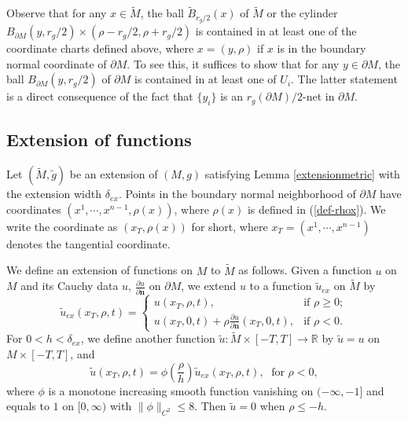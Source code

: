 \documentclass[11pt,letterpaper]{amsart}
\numberwithin{equation}{section}
\theoremstyle{definition}
\theoremstyle{plain}
\theoremstyle{definition}
\theoremstyle{plain}
\theoremstyle{definition}
\theoremstyle{plain}
\begin{document}
Observe that for any $x\in \widetilde{M}$, the ball $\widetilde{B}_{r_g/2}(x)$ of $\widetilde{M}$ or the cylinder $B_{\partial M}(y,r_g/2)\times (\rho-r_g/2,\rho+r_g/2)$ is contained in at least one of the coordinate charts defined above, where $x=(y,\rho)$ if $x$ is in the boundary normal coordinate of $\partial M$. To see this, it suffices to show that for any $y\in \partial M$, the ball $B_{\partial M}(y,r_g/2)$ of $\partial M$ is contained in at least one of $U_i$. The latter statement is a direct consequence of the fact that $\{y_i\}$ is an $r_g(\partial M)/2$-net in $\partial M$.


\subsection{Extension of functions} \hfill

\smallskip
Let $(\widetilde{M},\widetilde{g})$ be an extension of $(M,g)$ satisfying Lemma \ref{extensionmetric} with the extension width $\delta_{ex}$. Points in the boundary normal neighborhood of $\partial M$ have coordinates $(x^1,\cdots,x^{n-1},\rho(x))$, where $\rho(x)$ is defined in (\ref{def-rhox}). We write the coordinate as $(x_T,\rho(x))$ for short, where $x_T=(x^1,\cdots,x^{n-1})$ denotes the tangential coordinate.

We define an extension of functions on $M$ to $\widetilde{M}$ as follows. Given a function $u$ on $M$ and its Cauchy data $u,\, \frac{\partial u}{\partial \mathbf{n}}$ on $\partial M$, we extend $u$ to a function $\widetilde{u}_{ex}$ on $\widetilde{M}$ by
\begin{equation*}
\widetilde{u}_{ex}(x_T,\rho,t) = \left\{ \begin{array}{ll}
         u(x_T,\rho,t), & \mbox{if $\rho \geqslant 0$};\\
         u(x_T,0,t)+\rho \frac{\partial u}{\partial \mathbf{n}}(x_T,0,t), & \mbox{if $\rho<0$}.\end{array} \right. 
\end{equation*}
For $0<h<\delta_{ex}$, we define another function $\widetilde{u}:\widetilde{M}\times [-T,T]\to \mathbb{R}$ by $\widetilde{u}=u$ on $M\times [-T,T]$, and
\begin{equation}\label{extensionu}
\widetilde{u}(x_T,\rho,t)=\phi(\frac{\rho}{h}) \widetilde{u}_{ex} (x_T,\rho,t), \; \textrm{ for }\rho< 0,
\end{equation}
where $\phi$ is a monotone increasing smooth function vanishing on $(-\infty,-1]$ and equals to $1$ on $[0,\infty)$ with $\|\phi\|_{C^2}\leqslant 8$. Then $\widetilde{u}=0$ when $\rho\leqslant -h$.
\end{document}
